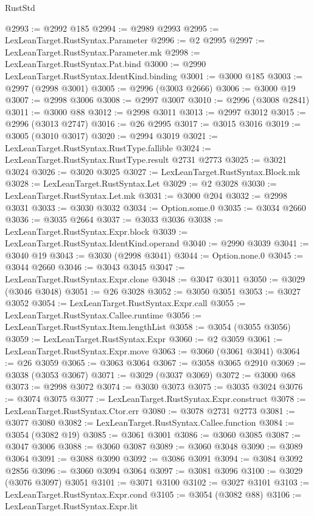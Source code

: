 \begin{lexlean}{RustStd}
\begin{coremodule}
@2993 := @2992 @185
@2994 := @2989 @2993
@2995 := LexLeanTarget.RustSyntax.Parameter
@2996 := @2 @2995
@2997 := LexLeanTarget.RustSyntax.Parameter.mk
@2998 := LexLeanTarget.RustSyntax.Pat.bind
@3000 := @2990 LexLeanTarget.RustSyntax.IdentKind.binding
@3001 := @3000 @185
@3003 := @2997 (@2998 @3001)
@3005 := @2996 (@3003 @2666)
@3006 := @3000 @19
@3007 := @2998 @3006
@3008 := @2997 @3007
@3010 := @2996 (@3008 @2841)
@3011 := @3000 @88
@3012 := @2998 @3011
@3013 := @2997 @3012
@3015 := @2996 (@3013 @2747)
@3016 := @26 @2995
@3017 := @3015 @3016
@3019 := @3005 (@3010 @3017)
@3020 := @2994 @3019
@3021 := LexLeanTarget.RustSyntax.RustType.fallible
@3024 := LexLeanTarget.RustSyntax.RustType.result @2731 @2773
@3025 := @3021 @3024
@3026 := @3020 @3025
@3027 := LexLeanTarget.RustSyntax.Block.mk
@3028 := LexLeanTarget.RustSyntax.Let
@3029 := @2 @3028
@3030 := LexLeanTarget.RustSyntax.Let.mk
@3031 := @3000 @204
@3032 := @2998 @3031
@3033 := @3030 @3032
@3034 := Option.some.{0}
@3035 := @3034 @2660
@3036 := @3035 @2664
@3037 := @3033 @3036
@3038 := LexLeanTarget.RustSyntax.Expr.block
@3039 := LexLeanTarget.RustSyntax.IdentKind.operand
@3040 := @2990 @3039
@3041 := @3040 @19
@3043 := @3030 (@2998 @3041)
@3044 := Option.none.{0}
@3045 := @3044 @2660
@3046 := @3043 @3045
@3047 := LexLeanTarget.RustSyntax.Expr.clone
@3048 := @3047 @3011
@3050 := @3029 (@3046 @3048)
@3051 := @26 @3028
@3052 := @3050 @3051
@3053 := @3027 @3052
@3054 := LexLeanTarget.RustSyntax.Expr.call
@3055 := LexLeanTarget.RustSyntax.Callee.runtime
@3056 := LexLeanTarget.RustSyntax.Item.lengthList
@3058 := @3054 (@3055 @3056)
@3059 := LexLeanTarget.RustSyntax.Expr
@3060 := @2 @3059
@3061 := LexLeanTarget.RustSyntax.Expr.move
@3063 := @3060 (@3061 @3041)
@3064 := @26 @3059
@3065 := @3063 @3064
@3067 := @3058 @3065 @2910
@3069 := @3038 (@3053 @3067)
@3071 := @3029 (@3037 @3069)
@3072 := @3000 @68
@3073 := @2998 @3072
@3074 := @3030 @3073
@3075 := @3035 @3024
@3076 := @3074 @3075
@3077 := LexLeanTarget.RustSyntax.Expr.construct
@3078 := LexLeanTarget.RustSyntax.Ctor.err
@3080 := @3078 @2731 @2773
@3081 := @3077 @3080
@3082 := LexLeanTarget.RustSyntax.Callee.function
@3084 := @3054 (@3082 @19)
@3085 := @3061 @3001
@3086 := @3060 @3085
@3087 := @3047 @3006
@3088 := @3060 @3087
@3089 := @3060 @3048
@3090 := @3089 @3064
@3091 := @3088 @3090
@3092 := @3086 @3091
@3094 := @3084 @3092 @2856
@3096 := @3060 @3094 @3064
@3097 := @3081 @3096
@3100 := @3029 (@3076 @3097) @3051
@3101 := @3071 @3100
@3102 := @3027 @3101
@3103 := LexLeanTarget.RustSyntax.Expr.cond
@3105 := @3054 (@3082 @88)
@3106 := LexLeanTarget.RustSyntax.Expr.lit

\end{coremodule}
\end{lexlean}
